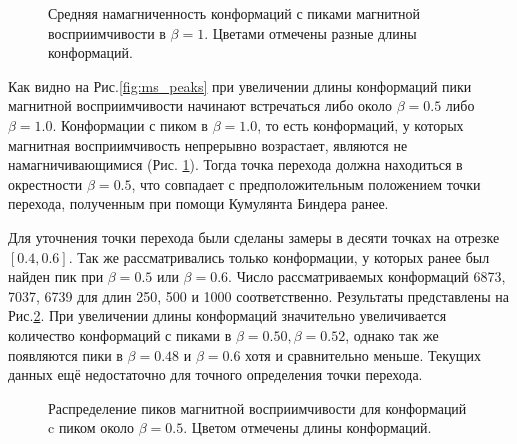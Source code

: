 \begin{figure}[hbt]
	\centering
	
	\caption{Средняя намагниченность конформаций с пиками магнитной восприимчивости в $\beta = 1$. Цветами отмечены разные длины конформаций.}
	\label{fig:no_peaks_mag2}
\end{figure}


Как видно на Рис.\ref{fig:ms_peaks} при увеличении длины конформаций пики магнитной восприимчивости начинают встречаться либо около $\beta = 0.5$ либо $\beta = 1.0$. Конформации с пиком в $\beta = 1.0$, то есть конформаций, у которых магнитная восприимчивость непрерывно возрастает, являются не намагничивающимися (Рис. \ref{fig:no_peaks_mag2}). Тогда точка перехода должна находиться в окрестности $\beta = 0.5$, что совпадает с предположительным положением точки перехода, полученным при помощи Кумулянта Биндера \cite{binder_cumulant} ранее. 





Для уточнения точки перехода были сделаны замеры в десяти точках на отрезке $[0.4, 0.6]$. Так же рассматривались только конформации, у которых ранее был найден пик при $\beta=0.5$ или $\beta=0.6$. Число рассматриваемых конформаций 6873, 7037, 6739 для длин 250, 500 и 1000 соответственно. Результаты представлены на Рис.\ref{fig:ms_peaks_close}. При увеличении длины конформаций значительно увеличивается количество конформаций с пиками в $\beta = 0.50, \beta = 0.52$, однако так же появляются пики в $\beta = 0.48$ и $ \beta = 0.6$ хотя и сравнительно меньше. Текущих данных ещё недостаточно для точного определения точки перехода.


\begin{figure}[htb]
	\centering
	
	\caption{Распределение пиков магнитной восприимчивости для конформаций c пиком около $\beta = 0.5$. Цветом отмечены длины конформаций.}
	\label{fig:ms_peaks_close}
\end{figure}

